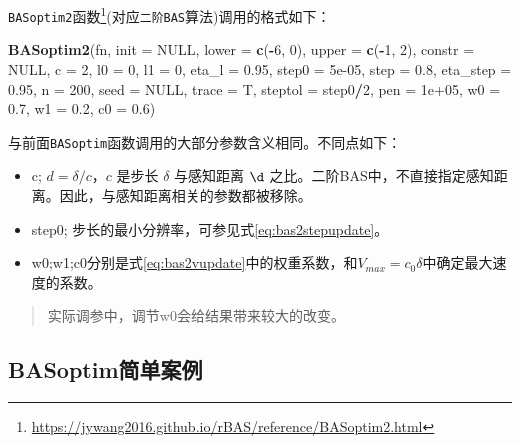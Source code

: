 \documentclass[]{ctexbook}
\newenvironment{Shaded}{\begin{snugshade}}{\end{snugshade}}
\newcommand{\KeywordTok}[1]{\textcolor[rgb]{0.13,0.29,0.53}{\textbf{#1}}}
\newcommand{\DataTypeTok}[1]{\textcolor[rgb]{0.13,0.29,0.53}{#1}}
\newcommand{\DecValTok}[1]{\textcolor[rgb]{0.00,0.00,0.81}{#1}}
\newcommand{\FloatTok}[1]{\textcolor[rgb]{0.00,0.00,0.81}{#1}}
\newcommand{\OtherTok}[1]{\textcolor[rgb]{0.56,0.35,0.01}{#1}}
\newcommand{\OperatorTok}[1]{\textcolor[rgb]{0.81,0.36,0.00}{\textbf{#1}}}
\newcommand{\NormalTok}[1]{#1}
\providecommand{\tightlist}{%
  \setlength{\itemsep}{0pt}\setlength{\parskip}{0pt}}
\renewcommand{\href}[2]{#2\footnote{\url{#1}}}
\begin{document}
\href{https://jywang2016.github.io/rBAS/reference/BASoptim2.html}{\texttt{BASoptim2}函数}(对应\texttt{二阶BAS}算法)调用的格式如下：

\begin{Shaded}
\begin{Highlighting}[]
\KeywordTok{BASoptim2}\NormalTok{(fn, }\DataTypeTok{init =} \OtherTok{NULL}\NormalTok{, }\DataTypeTok{lower =} \KeywordTok{c}\NormalTok{(}\OperatorTok{-}\DecValTok{6}\NormalTok{, }\DecValTok{0}\NormalTok{), }\DataTypeTok{upper =} \KeywordTok{c}\NormalTok{(}\OperatorTok{-}\DecValTok{1}\NormalTok{, }\DecValTok{2}\NormalTok{),}
          \DataTypeTok{constr =} \OtherTok{NULL}\NormalTok{, }\DataTypeTok{c =} \DecValTok{2}\NormalTok{, }\DataTypeTok{l0 =} \DecValTok{0}\NormalTok{, }\DataTypeTok{l1 =} \DecValTok{0}\NormalTok{, }\DataTypeTok{eta_l =} \FloatTok{0.95}\NormalTok{,}
          \DataTypeTok{step0 =} \FloatTok{5e-05}\NormalTok{, }\DataTypeTok{step =} \FloatTok{0.8}\NormalTok{, }\DataTypeTok{eta_step =} \FloatTok{0.95}\NormalTok{, }\DataTypeTok{n =} \DecValTok{200}\NormalTok{,}
          \DataTypeTok{seed =} \OtherTok{NULL}\NormalTok{, }\DataTypeTok{trace =}\NormalTok{ T, }\DataTypeTok{steptol =}\NormalTok{ step0}\OperatorTok{/}\DecValTok{2}\NormalTok{, }\DataTypeTok{pen =} \FloatTok{1e+05}\NormalTok{,}
          \DataTypeTok{w0 =} \FloatTok{0.7}\NormalTok{, }\DataTypeTok{w1 =} \FloatTok{0.2}\NormalTok{, }\DataTypeTok{c0 =} \FloatTok{0.6}\NormalTok{)}
\end{Highlighting}
\end{Shaded}

与前面\texttt{BASoptim}函数调用的大部分参数含义相同。不同点如下：

\begin{itemize}
\tightlist
\item
  c; \(d = \delta/c\)，\(c\) 是步长 \(\delta\) 与感知距离 \(\d\)
  之比。二阶BAS中，不直接指定感知距离。因此，与感知距离相关的参数都被移除。
\item
  step0; 步长的最小分辨率，可参见式\eqref{eq:bas2stepupdate}。
\item
  w0;w1;c0分别是式\eqref{eq:bas2vupdate}中的权重系数，和\(V_{max} = c_0 \delta\)中确定最大速度的系数。
\end{itemize}

\begin{quote}
实际调参中，调节w0会给结果带来较大的改变。
\end{quote}

\subsection{BASoptim简单案例}\label{BASexamples}
\end{document}
